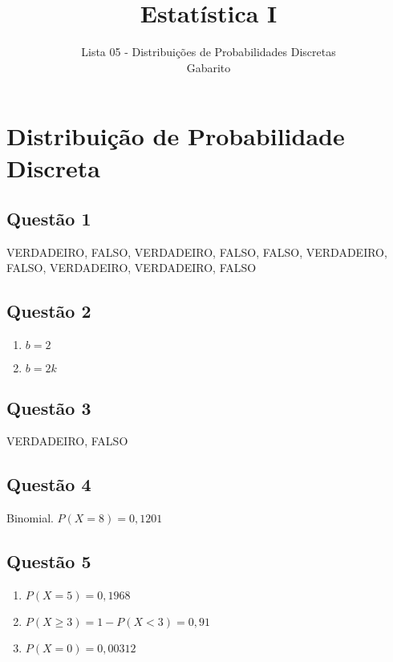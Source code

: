 \documentclass[
]{article}
\title{Estatística I}
\subtitle{Lista 05 - Distribuições de Probabilidades Discretas\\
Gabarito}
\author{}
\date{\vspace{-2.5em}}
\begin{document}
\maketitle

\hypertarget{distribuiuxe7uxe3o-de-probabilidade-discreta}{%
\section{Distribuição de Probabilidade
Discreta}\label{distribuiuxe7uxe3o-de-probabilidade-discreta}}

\hypertarget{questuxe3o-1}{%
\subsection{Questão 1}\label{questuxe3o-1}}

VERDADEIRO, FALSO, VERDADEIRO, FALSO, FALSO, VERDADEIRO, FALSO,
VERDADEIRO, VERDADEIRO, FALSO

\hypertarget{questuxe3o-2}{%
\subsection{Questão 2}\label{questuxe3o-2}}

\begin{enumerate}
\def\labelenumi{\alph{enumi})}
\item
  \(b=2\)
\item
  \(b=2k\)
\end{enumerate}

\hypertarget{questuxe3o-3}{%
\subsection{Questão 3}\label{questuxe3o-3}}

VERDADEIRO, FALSO

\hypertarget{questuxe3o-4}{%
\subsection{Questão 4}\label{questuxe3o-4}}

Binomial. \(P(X=8)=0,1201\)

\hypertarget{questuxe3o-5}{%
\subsection{Questão 5}\label{questuxe3o-5}}

\begin{enumerate}
\def\labelenumi{\alph{enumi})}
\item
  \(P(X=5)=0,1968\)
\item
  \(P(X\geq 3) = 1-P(X<3)=0,91\)
\item
  \(P(X=0)=0,00312\)
\end{enumerate}
\end{document}
